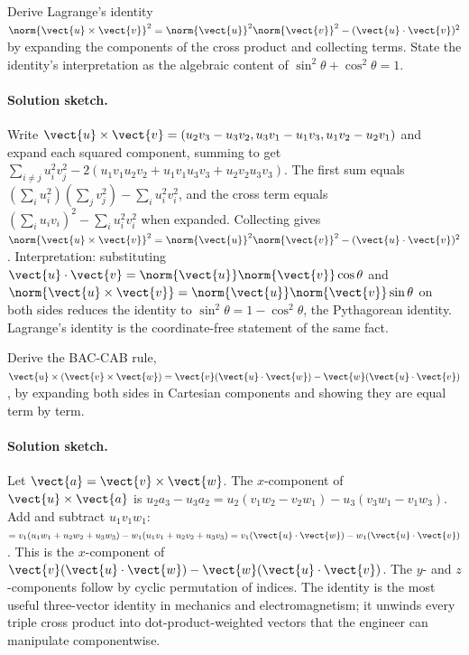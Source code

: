 \begin{exercise}
Derive Lagrange's identity $\norm{\vect{u} \times \vect{v}}^{2} =
\norm{\vect{u}}^{2}\norm{\vect{v}}^{2} - (\vect{u} \cdot
\vect{v})^{2}$ by expanding the components of the cross product and
collecting terms. State the identity's interpretation as the
algebraic content of $\sin^{2}\theta + \cos^{2}\theta = 1$.

\paragraph{Solution sketch.} Write $\vect{u}\times\vect{v} = (u_{2}
v_{3} - u_{3} v_{2}, u_{3} v_{1} - u_{1} v_{3}, u_{1} v_{2} - u_{2}
v_{1})$ and expand each squared component, summing to get
$\sum_{i\neq j} u_{i}^{2} v_{j}^{2} - 2 (u_{1} v_{1} u_{2} v_{2} +
u_{1} v_{1} u_{3} v_{3} + u_{2} v_{2} u_{3} v_{3})$. The first sum
equals $\left(\sum_{i} u_{i}^{2}\right)\left(\sum_{j} v_{j}^{2}
\right) - \sum_{i} u_{i}^{2} v_{i}^{2}$, and the cross term equals
$\left(\sum_{i} u_{i} v_{i}\right)^{2} - \sum_{i} u_{i}^{2} v_{i}^{2}$
when expanded. Collecting gives $\norm{\vect{u}\times\vect{v}}^{2} =
\norm{\vect{u}}^{2}\norm{\vect{v}}^{2} - (\vect{u}\cdot\vect{v})^{2}$.
Interpretation: substituting $\vect{u}\cdot\vect{v} = \norm{\vect{u}}
\norm{\vect{v}}\cos\theta$ and $\norm{\vect{u}\times\vect{v}} =
\norm{\vect{u}}\norm{\vect{v}}\sin\theta$ on both sides reduces the
identity to $\sin^{2}\theta = 1 - \cos^{2}\theta$, the Pythagorean
identity. Lagrange's identity is the coordinate-free statement of
the same fact.
\end{exercise}

\begin{exercise}
Derive the BAC-CAB rule, $\vect{u} \times (\vect{v} \times \vect{w})
= \vect{v}(\vect{u} \cdot \vect{w}) - \vect{w}(\vect{u} \cdot
\vect{v})$, by expanding both sides in Cartesian components and
showing they are equal term by term.

\paragraph{Solution sketch.} Let $\vect{a} = \vect{v}\times\vect{w}$.
The $x$-component of $\vect{u}\times\vect{a}$ is $u_{2} a_{3} -
u_{3} a_{2} = u_{2}(v_{1} w_{2} - v_{2} w_{1}) - u_{3}(v_{3} w_{1}
- v_{1} w_{3})$. Add and subtract $u_{1} v_{1} w_{1}$:
$= v_{1}(u_{1} w_{1} + u_{2} w_{2} + u_{3} w_{3}) - w_{1}(u_{1}
v_{1} + u_{2} v_{2} + u_{3} v_{3}) = v_{1}(\vect{u}\cdot\vect{w}) -
w_{1}(\vect{u}\cdot\vect{v})$. This is the $x$-component of
$\vect{v}(\vect{u}\cdot\vect{w}) - \vect{w}(\vect{u}\cdot\vect{v})$.
The $y$- and $z$-components follow by cyclic permutation of indices.
The identity is the most useful three-vector identity in mechanics
and electromagnetism; it unwinds every triple cross product into
dot-product-weighted vectors that the engineer can manipulate
componentwise.
\end{exercise}

